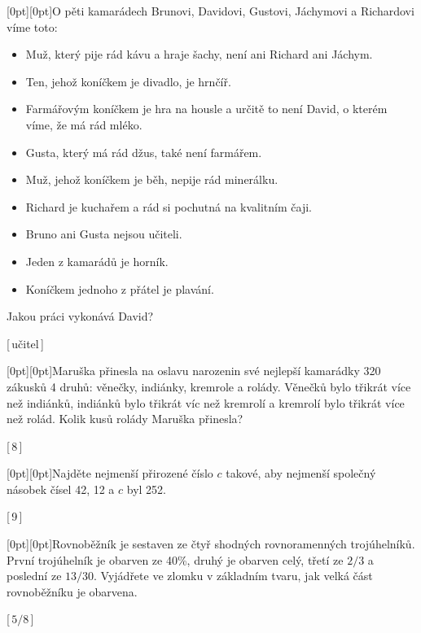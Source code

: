 \documentclass[10pt, notitlepage]{article}
\def \ifzadani{\ifx\reseni\undefined}
\def \cislotymu {42}%
\def \printcislotymu {\llap{\it(\cislotymu) \qquad}}
\newcommand{\priklad}[2]{
    \begin{minipage}{\textwidth}
    \item \noindent \printcislotymu \raisebox{0pt}[0pt][0pt]{\llap{\raisebox{-5.3ex}{\qrcode{T\cislotymu P\number\numexpr\value{enumi}\relax} \enskip}}}#1
    \ifzadani
        \vspace{45pt}
    \else
        \begin{flushright}\vspace{-6pt} [$\,$#2$\,$]\vspace{28pt}\end{flushright}
    \fi
    \end{minipage}}
\newcommand{\prikladsobrazkem}[5]{
    \begin{minipage}{\textwidth}  
      \begin{minipage}[l]{#5\textwidth}
      \item \noindent \printcislotymu \raisebox{0pt}[0pt][0pt]{\llap{\raisebox{-5.3ex}{\qrcode{T\cislotymu P\number\numexpr\value{enumi}\relax} \enskip}}}#1
    \end{minipage}\hspace{0.05\textwidth}
    \begin{minipage}[r]{#4\textwidth}
      \begin{center}
        \texttt{[image: \#3]}
      \end{center}
    \end{minipage}
      \ifzadani
        \vspace{45pt}
      \else
      \begin{flushright}\vspace{-6pt}[$\,$#2$\,$]\vspace{28pt}\end{flushright}
      \fi
    \end{minipage}}
\begin{document}
\begin{enumerate}
  \priklad{O pěti kamarádech Brunovi, Davidovi, Gustovi, Jáchymovi a Richardovi víme toto:
    \begin{itemize}
    \item Muž, který pije rád kávu a hraje šachy, není ani Richard ani Jáchym. 
    \item Ten, jehož koníčkem je divadlo, je hrnčíř.
    \item Farmářovým koníčkem je hra na housle a určitě to není David, o kterém víme, že má rád mléko.
    \item Gusta, který má rád džus, také není farmářem.
    \item Muž, jehož koníčkem je běh, nepije rád minerálku.
    \item Richard je kuchařem a rád si pochutná na kvalitním čaji.
    \item Bruno ani Gusta nejsou učiteli.
    \item Jeden z kamarádů je horník.
    \item Koníčkem jednoho z přátel je plavání.
    \end{itemize}
  Jakou práci vykonává David?}{učitel}
  
  
  \priklad{Maruška přinesla na oslavu narozenin své nejlepší kamarádky 320 zákusků 4 druhů: věnečky, indiánky, kremrole a rolády. Věnečků bylo třikrát více než indiánků, indiánků bylo třikrát víc než kremrolí a kremrolí bylo třikrát více než rolád. Kolik kusů rolády Maruška přinesla?}{8}
    
  
  \priklad{Najděte nejmenší přirozené číslo $ c $ takové, aby nejmenší společný násobek čísel 42, 12 a $ c $ byl 252.}{9}
  
  
  
  
  \priklad{Rovnoběžník je sestaven ze čtyř shodných rovnoramenných trojúhelníků. První trojúhelník je obarven ze 40\%, druhý je obarven celý, třetí ze $ 2/3 $ a poslední ze $ 13/30 $. Vyjádřete ve zlomku v základním tvaru, jak velká část rovnoběžníku je obarvena.}{$ 5/8 $}
  
  

\end{enumerate}
\end{document}
